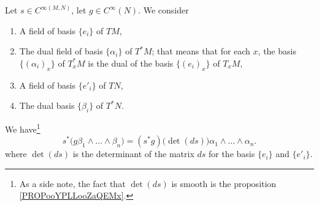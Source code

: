 	\begin{proposition}		\label{PROPooHUDYooLCAYZW}
	Let \( s\in C^{\infty(M,N)}\), let \( g\in C^{\infty}(N)\). We consider
	\begin{enumerate}
	\item
	A field of basis \( \{ e_i \}\) of \( TM\),
	\item
	The dual field of basis \( \{ \alpha_i \}\) of \( T^*M\); that means that for each \( x\), the basis \( \{ (\alpha_i)_x \}\) of \( T^*_xM\) is the dual of the basis \( \{ (e_i)_x \}\) of \( T_xM\),
	\item
	A field of basis \( \{ e'_i \}\) of \( TN\),
	\item
	The dual basis \( \{ \beta_i \}\) of \( T^*N\).
	\end{enumerate}

	We have\footnote{As a side note, the fact that \( \det(ds)\) is smooth is the proposition \ref{PROPooYPLLooZaQEMx}.}
	\begin{equation}	\label{EQooWODAooMroYCO}
	s^*\big( g\beta_1\wedge\ldots\wedge \beta_n \big)=(s^*g)\big( \det(ds) \big)\alpha_1\wedge\ldots\wedge \alpha_n.
	\end{equation}
	where \( \det(ds)\) is the determinant of the matrix \( ds\) for the basis \( \{ e_i \}\) and \( \{ e'_i \}\).
	\end{proposition}

